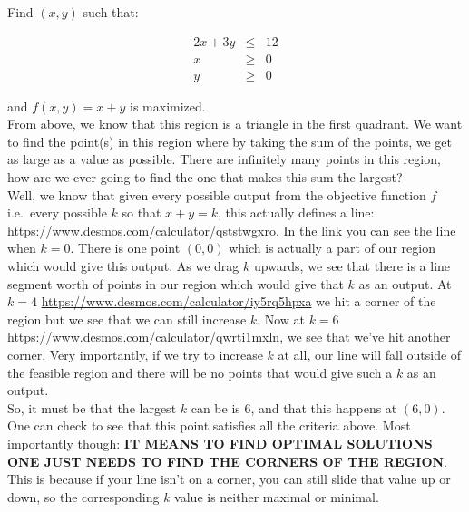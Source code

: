 \begin{example}
Find $(x,y)$ such that:

\begin{eqnarray*}
2x+3y&\leq&12\\
x&\geq&0\\
y&\geq&0
\end{eqnarray*}

and $f(x,y)=x+y$ is maximized.\\

From above, we know that this region is a triangle in the first quadrant.  We want to find the point(s) in this region where by taking the sum of the points, we get as large as a value as possible.  There are infinitely many points in this region, how are we ever going to find the one that makes this sum the largest?\\

Well, we know that given every possible output from the objective function $f$ i.e.\ every possible $k$ so that $x+y=k$, this actually defines a line: \url{https://www.desmos.com/calculator/qststwgxro}.  In the link you can see the line when $k=0$.  There is one point $(0,0)$ which is actually a part of our region which would give this output.  As we drag $k$ upwards, we see that there is a line segment worth of points in our region which would give that $k$ as an output.  At $k=4$ \url{https://www.desmos.com/calculator/iy5rq5hpxa} we hit a corner of the region but we see that we can still increase $k$.  Now at $k=6$ \url{https://www.desmos.com/calculator/qwrti1mxln}, we see that we've hit another corner.  Very importantly, if we try to increase $k$ at all, our line will fall outside of the feasible region and there will be no points that would give such a $k$ as an output.\\

So, it must be that the largest $k$ can be is 6, and that this happens at $(6,0)$.  One can check to see that this point satisfies all the criteria above.  Most importantly though: \textbf{IT MEANS TO FIND OPTIMAL SOLUTIONS ONE JUST NEEDS TO FIND THE CORNERS OF THE REGION}.  This is because if your line isn't on a corner, you can still slide that value up or down, so the corresponding $k$ value is neither maximal or minimal.


\end{example}


